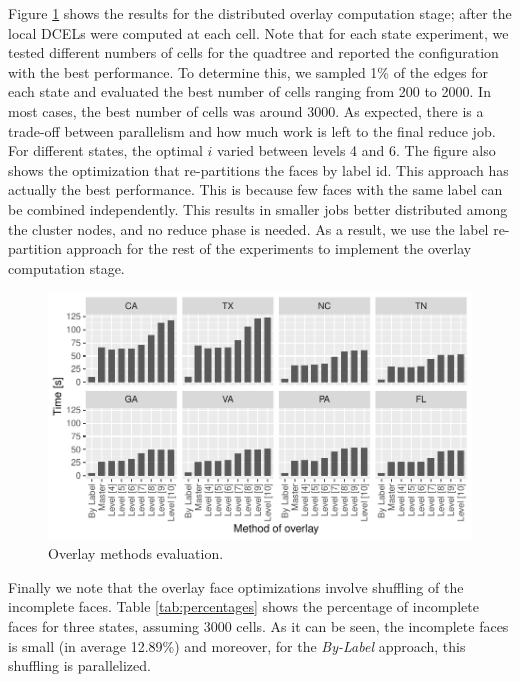 Figure \ref{fig:overlay_tester} shows the results for the distributed overlay computation stage; after the local DCELs were computed at each cell. 
Note that for each state experiment, we tested different numbers of cells for the quadtree and reported the configuration with the best performance. To determine this, we sampled 1\% of the edges for each state and evaluated the best number of cells ranging from 200 to 2000. In most cases, the best number of cells was around 3000.
As expected, there is a trade-off between parallelism and how much work is left to the final reduce job. For different states, the optimal $i$ varied between levels 4 and 6. The figure also shows the optimization that re-partitions the faces by label id. This approach has actually the best performance. This is because few faces with the same label can be combined independently. This results in smaller jobs better distributed among the cluster nodes, and no reduce phase is needed. As a result, we use the label re-partition approach for the rest of the experiments to implement the overlay computation stage.

\begin{figure}
    \centering
    \includegraphics[width=\linewidth]{chapterSDCEL/Overlay_Tester}
    \caption{Overlay methods evaluation.}\label{fig:overlay_tester}
\end{figure}

Finally we note that the overlay face optimizations involve shuffling of the incomplete faces. Table \ref{tab:percentages} shows the percentage of incomplete faces for three states, assuming 3000 cells. As it can be seen, the incomplete faces is small (in average 12.89\%) and moreover, for the \textit{By-Label} approach, this shuffling is parallelized.

